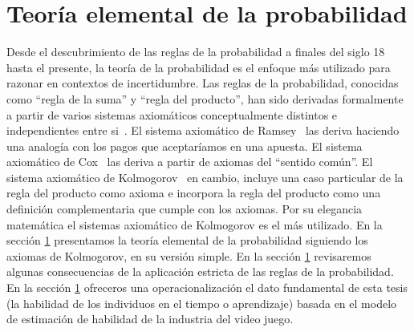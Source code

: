 \documentclass[a4paper,11pt]{book}
\theoremstyle{definition}
\begin{document}


\section{Teor\'ia elemental de la probabilidad}

Desde el descubrimiento de las reglas de la probabilidad a finales del siglo 18 hasta el presente, la teor\'ia de la probabilidad es el enfoque m\'as utilizado para razonar en contextos de incertidumbre.
%
Las reglas de la probabilidad, conocidas como ``regla de la suma'' y ``regla del producto'', han sido derivadas formalmente a partir de varios sistemas axiom\'aticos conceptualmente distintos e independientes entre si~\cite{halpern2017}.
%
El sistema axiom\'atico de Ramsey~\cite{Ramsey1926} las deriva haciendo una analog\'ia con los pagos que aceptar\'iamos en una apuesta.
%
El sistema axiom\'atico de Cox~\cite{Cox1946} las deriva a partir de axiomas del ``sentido com\'un''.
%
El sistema axiom\'atico de Kolmogorov~\cite{Kolmogorov1950} en cambio, incluye una caso particular de la regla del producto como axioma e incorpora la regla del producto como una definici\'on complementaria que cumple con los axiomas.
%
Por su elegancia matem\'atica el sistemas axiom\'atico de Kolmogorov es el m\'as utilizado.
%
En la secci\'on \ref{} presentamos la teor\'ia elemental de la probabilidad siguiendo los axiomas de Kolmogorov, en su versi\'on simple.
%
En la secci\'on \ref{} revisaremos algunas consecuencias de la aplicaci\'on estricta de las reglas de la probabilidad.
%
En la secci\'on \ref{} ofreceros una operacionalizaci\'on el dato fundamental de esta tesis (la habilidad de los individuos en el tiempo o aprendizaje) basada en el modelo de estimaci\'on de habilidad de la industria del video juego.
\end{document}
